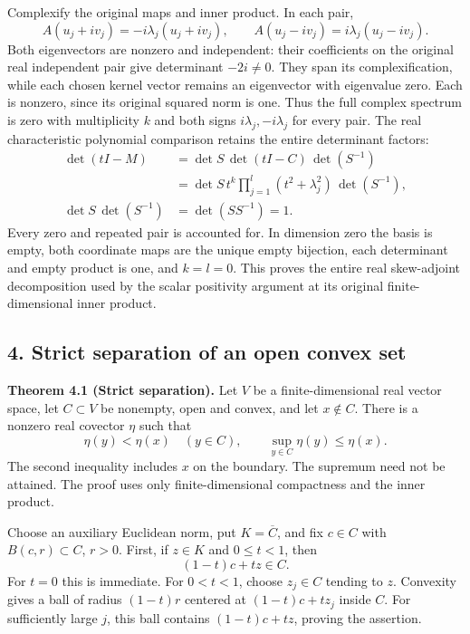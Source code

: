 \documentclass[
  11pt,
]{article}
\begin{document}
Complexify the original maps and inner product. In each pair, \[
A(u_j+i v_j)=-i\lambda_j(u_j+i v_j),\qquad
A(u_j-i v_j)=i\lambda_j(u_j-i v_j).
\tag{SS9}
\] Both eigenvectors are nonzero and independent: their coefficients on
the original real independent pair give determinant \(-2i\ne0\). They
span its complexification, while each chosen kernel vector remains an
eigenvector with eigenvalue zero. Each is nonzero, since its original
squared norm is one. Thus the full complex spectrum is zero with
multiplicity \(k\) and both signs \(i\lambda_j,-i\lambda_j\) for every
pair. The real characteristic polynomial comparison retains the entire
determinant factors: \[
\begin{split}
\det(tI-M)
&=\det S\,\det(tI-C)\,\det(S^{-1})\\
&=\det S\,t^k\prod_{j=1}^l(t^2+\lambda_j^2)\,\det(S^{-1}),\\
\det S\,\det(S^{-1})&=\det(SS^{-1})=1.
\end{split}
\tag{SS10}
\] Every zero and repeated pair is accounted for. In dimension zero the
basis is empty, both coordinate maps are the unique empty bijection,
each determinant and empty product is one, and \(k=l=0\). This proves
the entire real skew-adjoint decomposition used by the scalar positivity
argument at its original finite-dimensional inner product.

\subsection{4. Strict separation of an open convex
set}\label{strict-separation-of-an-open-convex-set}

\textbf{Theorem 4.1 (Strict separation).} Let \(V\) be a
finite-dimensional real vector space, let \(C\subset V\) be nonempty,
open and convex, and let \(x\notin C\). There is a nonzero real covector
\(\eta\) such that \[
\eta(y)<\eta(x)\quad(y\in C),
\qquad \sup_{y\in C}\eta(y)\leq\eta(x).
\] The second inequality includes \(x\) on the boundary. The supremum
need not be attained. The proof uses only finite-dimensional compactness
and the inner product.

Choose an auxiliary Euclidean norm, put \(K=\overline C\), and fix
\(c\in C\) with \(B(c,r)\subset C\), \(r>0\). First, if \(z\in K\) and
\(0\leq t<1\), then \[
(1-t)c+tz\in C.
\] For \(t=0\) this is immediate. For \(0<t<1\), choose \(z_j\in C\)
tending to \(z\). Convexity gives a ball of radius \((1-t)r\) centered
at \((1-t)c+tz_j\) inside \(C\). For sufficiently large \(j\), this ball
contains \((1-t)c+tz\), proving the assertion.
\end{document}
